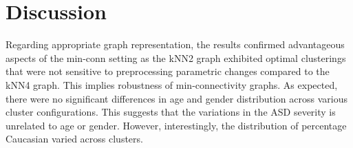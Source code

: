 \documentclass{bmcart}
\begin{document}
\begin{table}[!ht]
  \caption{Set of discriminant features by clustering result for No Node Reassignment}
  \label{tab:featextNR}
  \centering
\end{table} 






\section*{Discussion}

Regarding appropriate graph representation, the results confirmed advantageous aspects of the min-conn setting as the kNN2 graph exhibited optimal clusterings that were not sensitive to preprocessing parametric changes compared to the kNN4 graph. This implies robustness of min-connectivity graphs. %
As expected, there were no significant differences in age and gender distribution across various cluster configurations. This suggests that the variations in the ASD severity is unrelated to age or gender. However, interestingly, the distribution of percentage Caucasian varied across clusters. 
\end{document}
